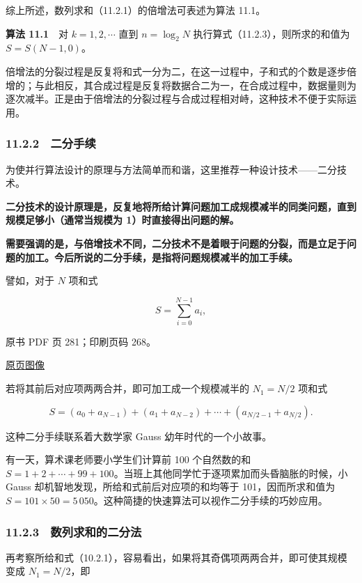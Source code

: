 综上所述，数列求和（11.2.1）的倍增法可表述为算法 11.1。

\textbf{算法 11.1}　对 \(k=1,2,\cdots\) 直到 \(n=\log_2 N\) 执行算式（11.2.3），则所求的和值为 \(S=S(N-1,0)\)。

倍增法的分裂过程是反复将和式一分为二，在这一过程中，子和式的个数是逐步倍增的；与此相反，其合成过程是反复将数据合二为一，在合成过程中，数据量则为逐次减半。正是由于倍增法的分裂过程与合成过程相对峙，这种技术不便于实际运用。

\subsubsection{11.2.2　二分手续}\label{ch11-ux4e8cux5206ux624bux7eed}

为使并行算法设计的原理与方法简单而和谐，这里推荐一种设计技术------二分技术。

\textbf{二分技术的设计原理是，反复地将所给计算问题加工成规模减半的同类问题，直到规模足够小（通常当规模为 1）时直接得出问题的解。}

\textbf{需要强调的是，与倍增技术不同，二分技术不是着眼于问题的分裂，而是立足于问题的加工。今后所说的二分手续，是指将问题规模减半的加工手续。}

譬如，对于 \(N\) 项和式

\[
S=\sum_{i=0}^{N-1}a_i,
\]

\clearpage

原书 PDF 页 281；印刷页码 268。

\href{source-images/pdf-281.jpeg}{原页图像}

若将其前后对应项两两合并，即可加工成一个规模减半的 \(N_1=N/2\) 项和式

\[
S=(a_0+a_{N-1})+(a_1+a_{N-2})+\cdots+(a_{N/2-1}+a_{N/2}).
\]

这种二分手续联系着大数学家 Gauss 幼年时代的一个小故事。

有一天，算术课老师要小学生们计算前 100 个自然数的和 \(S=1+2+\cdots+99+100\)。当班上其他同学忙于逐项累加而头昏脑胀的时候，小 Gauss 却机智地发现，所给和式前后对应项的和均等于 101，因而所求和值为 \(S=101\times50=5\,050\)。这种简捷的快速算法可以视作二分手续的巧妙应用。

\subsubsection{11.2.3　数列求和的二分法}\label{ch11-ux6570ux5217ux6c42ux548cux7684ux4e8cux5206ux6cd5}

再考察所给和式（10.2.1），容易看出，如果将其奇偶项两两合并，即可使其规模变成 \(N_1=N/2\)，即

